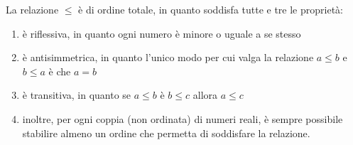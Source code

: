 {\begin{itemize}
        La relazione $ \le $ è di ordine totale, in quanto soddisfa tutte e tre le proprietà:
        \begin{enumerate}
            \item è riflessiva, in quanto ogni numero è minore o uguale a se stesso
            \item è antisimmetrica, in quanto l’unico modo per cui valga la relazione $ a\le b $ e $ b \le a $ è che $a=b$
            \item è transitiva, in quanto se $a\le b$ è $b\le c$ allora $a\le c$
            \item inoltre, per ogni coppia (non ordinata) di numeri reali, è sempre possibile stabilire almeno un ordine che permetta di soddisfare la relazione.
        \end{enumerate}
    \end{itemize}
}